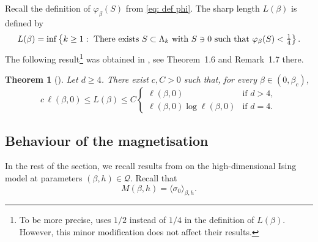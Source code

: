 \documentclass[11pt,a4paper]{article}
\numberwithin{equation}{section}
\theoremstyle{plain}
\newtheorem{Thm}{Theorem}[section]
\theoremstyle{definition}
\begin{document}
Recall the definition of $\varphi_{\beta}(S)$ from \eqref{eq: def phi}. The sharp length $L(\beta)$ is defined by 
\begin{equation}\label{eq:def L(beta)}
    L(\beta)=\inf\left\lbrace k\geq 1: \textup{ There exists } S\subset \Lambda_k \textup{ with }S\ni 0 \textup{ such that } \varphi_{\beta}(S)< \tfrac{1}{4}\right\rbrace.
\end{equation}
The following result\footnote{To be more precise, \cite{DuminilPanis2024newLB} uses $1/2$ instead of $1/4$ in the definition of $L(\beta)$. However, this minor modification does not affect their results.} was obtained in \cite{DuminilPanis2024newLB}, see Theorem~1.6 and Remark~1.7 there.
\begin{Thm}[{}]\label{thm:sharplength} Let $d\geq 4$. There exist $c,C>0$ such that, for every $\beta\in (0,\beta_c)$,
\begin{equation}
	c\,\ell(\beta,0)\leq L(\beta)\leq C\left\{
			\begin{array}{ll}
				\ell(\beta,0) & \mbox{if } d>4, \\
				\ell(\beta,0)\log \ell(\beta,0) & \mbox{if }d=4.
			\end{array}
			\right.
\end{equation}
\end{Thm}
%
%


\subsection{Behaviour of the magnetisation}
In the rest of the section, we recall results from \cite{AizenmanFernandezCriticalBehaviorMagnetization1986} on the high-dimensional Ising model at parameters $(\beta,h)\in \mathcal Q$. Recall that
\begin{equation}
	M(\beta,h)=\langle \sigma_0\rangle_{\beta,h}.
\end{equation}
\end{document}
